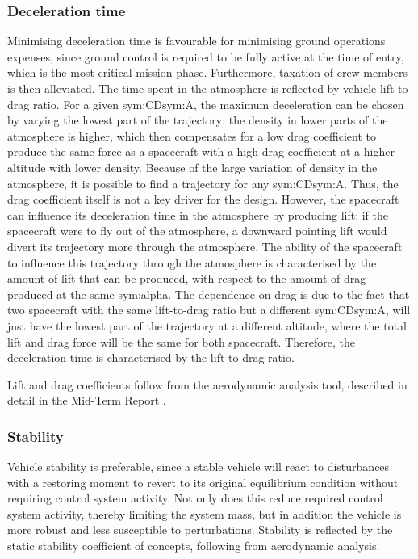 \subsubsection{Deceleration time}
Minimising deceleration time is favourable for minimising ground operations expenses, since ground control is required to be fully active at the time of entry, which is the most critical mission phase. Furthermore, taxation of crew members is then alleviated. The time spent in the atmosphere is reflected by vehicle lift-to-drag ratio. For a given \gls{sym:CD}\gls{sym:A}, the maximum deceleration can be chosen by varying the lowest part of the trajectory: the density in lower parts of the atmosphere is higher, which then compensates for a low drag coefficient to produce the same force as a spacecraft with a high drag coefficient at a higher altitude with lower density. Because of the large variation of density in the atmosphere, it is possible to find a trajectory for any \gls{sym:CD}\gls{sym:A}. Thus, the drag coefficient itself is not a key driver for the design. However, the spacecraft can influence its deceleration time in the atmosphere by producing lift: if the spacecraft were to fly out of the atmosphere, a downward pointing lift would divert its trajectory more through the atmosphere. The ability of the spacecraft to influence this trajectory through the atmosphere is characterised by the amount of lift that can be produced, with respect to the amount of drag produced at the same \gls{sym:alpha}. The dependence on drag is due to the fact that two spacecraft with the same lift-to-drag ratio but a different \gls{sym:CD}\gls{sym:A}, will just have the lowest part of the trajectory at a different altitude, where the total lift and drag force will be the same for both spacecraft. Therefore, the deceleration time is characterised by the  lift-to-drag ratio. 

Lift and drag coefficients follow from the aerodynamic analysis tool, described in detail in the Mid-Term Report \cite[p.34-46]{Balasooriyan2015b}.

\subsubsection{Stability}
Vehicle stability is preferable, since a stable vehicle will react to disturbances with a restoring moment to revert to its original equilibrium condition without requiring control system activity. Not only does this reduce required control system activity, thereby limiting the system mass, but in addition the vehicle is more robust and less susceptible to perturbations. Stability is reflected by the static stability coefficient of concepts, following from aerodynamic analysis.

